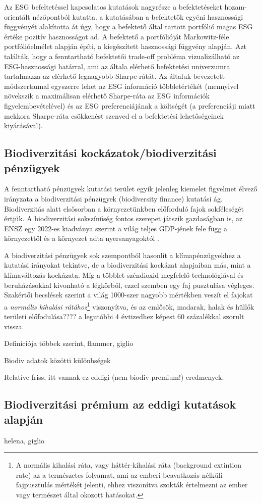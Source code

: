 Az ESG befeltetéssel kapcsolatos kutatások nagyrésze a befektetéseket hozam-orientált nézőpontból kutatta. \textcite{pedersen_responsible_2021} a kutatásában a befektetők egyéni hasznossági függvényét alakította át úgy, hogy a befektető által tartott portfólió magas ESG értéke pozitív hasznosságot ad. A befektető a portfólióját Markowitz-féle portfólióelmélet alapján építi, a kiegészített hasznossági függvény alapján. Azt találták, hogy a fenntartható befektetői trade-off probléma vizualizálható az ESG-hasznossági határral, ami az általa elérhető befektetési univerzumra tartalmazza az elérhető legnagyobb Sharpe-rátát. Az általuk bevezetett módszertannal egyszerre lehet az ESG információ többletértékét (mennyivel növekszik a maximálisan elérhető Sharpe-ráta az ESG információk figyelembevételével) és az ESG preferenciájának a költségét (a preferenciáji miatt mekkora Sharpe-ráta csökkenést szenved el a befektetési lehetőségeinek kiyárásával).

\subsection{Biodiverzitási kockázatok/biodiverzitási pénzügyek}

A fenntartható pénzügyek kutatási terület egyik jelenleg kiemelet figyelmet élvező irányzata a biodiverzitási pénzügyek (biodiversity finance) kutatási ág. Biodiverzitás alatt elsősorban a környezetünkben előforduló fajok sokféleségét értjük. A biodiverzitási sokszínűség fontos szerepet játszik gazdaságban is, az ENSZ egy 2022-es kiadványa szerint a világ teljes GDP-jének fele függ a környezettől és a környezet adta nyersanyagoktól \parencite{flammer_biodiversity_2025}.

A biodiverzitási pénzügyek sok szempontból hasonlít a klímapénzügyekhez a kutatási irányokat tekintve, de a biodiverzitási kockázat alapjaiban más, mint a klímaváltozás kockázata. Míg a többlet széndioxid megfelelő technológiával és beruházásokkal kivonható a légkörből, ezzel szemben egy faj pusztulása végleges. Szakértői becslések szerint a világ 1000-szer nagyobb mértékben veszít el fajokat a \textit{normális kihalási rátához}\footnote{A normális kihalási ráta, vagy háttér-kihalási ráta (background extintion rate) az a természetes folyamat, ami az emberi beavatkozás nélküli fajpusztulás mértékét jelenti, ehhez viszonítva szokták értelmezni az ember vagy természet által okozott hatásokat.}  viszonyítva, és az emlősök, madarak, halak és hüllők területi előfodulása???? a legutóbbi 4 évtizedhez képest 60 százalékkal szorult vissza. \parencite{karolyi_biodiversity_2023}

Definíciója többek szerint, flammer, giglio

Biodiv adatok közötti különbségek \parencite{clement_mapping_2025}

Relatíve friss, itt vannak ez eddigi (nem biodiv premium!) eredmenyek.

\subsection{Biodiverzitási prémium az eddigi kutatások alapján}

helena, giglio
